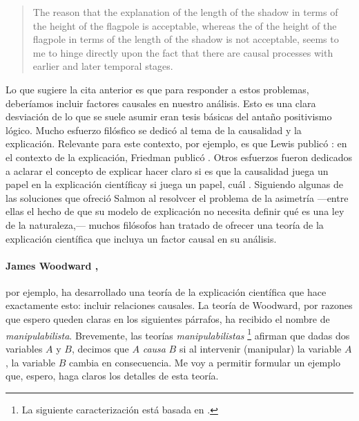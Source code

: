 \begin{quote}
	The reason that the explanation of the length of the shadow in terms
	of the height of the flagpole is acceptable, whereas the
	 of the height of the flagpole in terms of the
	length of the shadow is not acceptable, seems to me to hinge directly
	upon the fact that there are causal processes with earlier and later
	temporal stages. \parencite{Salmon1970}
\end{quote}

Lo que sugiere la cita anterior es que para responder a estos problemas,
deberíamos incluir factores causales en nuestro análisis. Esto es una
clara desviación de lo que se suele asumir eran tesis básicas del antaño
positivismo lógico.  Mucho esfuerzo filósfico se dedicó al tema de la causalidad y la explicación. Relevante para este contexto, por ejemplo, es que Lewis publicó : en el contexto de la explicación, Friedman publicó . Otros esfuerzos fueron dedicados a aclarar el concepto de explicar \parencite{} hacer claro si es que la causalidad juega un papel en la explicación científicay si juega un papel, cuál \parencite{Ca}. Siguiendo algunas de las soluciones que ofreció Salmon al resolvcer el problema de la asimetría ---entre
ellas el hecho de que su modelo de explicación no necesita definir
qué es una ley de la naturaleza,--- muchos filósofos han tratado de
ofrecer una teoría de la explicación científica que incluya un factor
causal en su análisis.

\paragraph{James Woodward \parencite{Woodward2004},} por ejemplo, ha
desarrollado una teoría de la explicación científica que hace exactamente
esto: incluir relaciones causales. La teoría de Woodward, por razones que
espero queden claras en los siguientes párrafos, ha recibido el nombre de
\emph{manipulabilista}. Brevemente, las teorías \emph{manipulabilistas}
\footnote{
	La	siguiente caracterización está basada en
	\parencite{sep-causation-mani, sep-causal-explanation-science,
		Woodward2004, Woodward2000-WOOEAI}.
}
afirman que dadas dos variables $ A $ y $ B $, decimos que $ A $
\emph{causa} $ B $ si al intervenir (manipular) la variable $ A $, la variable $ B $ cambia en consecuencia. Me voy a permitir formular un ejemplo que, espero, haga claros los detalles de esta teoría.

